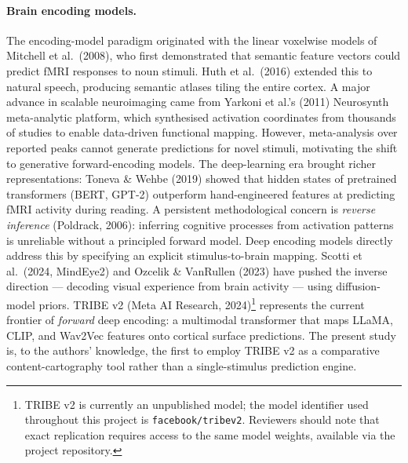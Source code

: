 \documentclass[11pt,letterpaper]{article}
\numberwithin{equation}{section}
\begin{document}
\paragraph{Brain encoding models.} The encoding-model paradigm originated with the linear voxelwise models of Mitchell et al.\ (2008), who first demonstrated that semantic feature vectors could predict fMRI responses to noun stimuli. Huth et al.\ (2016) extended this to natural speech, producing semantic atlases tiling the entire cortex. A major advance in scalable neuroimaging came from Yarkoni et al.'s (2011) Neurosynth meta-analytic platform, which synthesised activation coordinates from thousands of studies to enable data-driven functional mapping. However, meta-analysis over reported peaks cannot generate predictions for novel stimuli, motivating the shift to generative forward-encoding models. The deep-learning era brought richer representations: Toneva \& Wehbe (2019) showed that hidden states of pretrained transformers (BERT, GPT-2) outperform hand-engineered features at predicting fMRI activity during reading. A persistent methodological concern is \emph{reverse inference} (Poldrack, 2006): inferring cognitive processes from activation patterns is unreliable without a principled forward model. Deep encoding models directly address this by specifying an explicit stimulus-to-brain mapping. Scotti et al.\ (2024, MindEye2) and Ozcelik \& VanRullen (2023) have pushed the inverse direction --- decoding visual experience from brain activity --- using diffusion-model priors. TRIBE v2 (Meta AI Research, 2024)\footnote{TRIBE v2 is currently an unpublished model; the model identifier used throughout this project is \texttt{facebook/tribev2}. Reviewers should note that exact replication requires access to the same model weights, available via the project repository.} represents the current frontier of \textit{forward} deep encoding: a multimodal transformer that maps LLaMA, CLIP, and Wav2Vec features onto cortical surface predictions. The present study is, to the authors' knowledge, the first to employ TRIBE v2 as a comparative content-cartography tool rather than a single-stimulus prediction engine.
\end{document}
